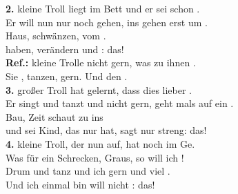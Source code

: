

\textbf{2.} kleine Troll liegt  im Bett und  er sei schon .\\
Er will nun nur noch  gehen, ins  gehen erst um .\\
Haus,  schwänzen,   vom .\\
 haben,  verändern und  :  das!\\[0.3em]
\textbf{Ref.:}  kleine Trolle  nicht gern, was  zu ihnen .\\
Sie , tanzen,  gern. Und  den  .\\[0.3em]
\textbf{3.}  großer Troll hat  gelernt, dass  dies lieber .\\
Er singt und tanzt und  nicht gern, geht mals auf ein .\\
Bau,  Zeit schaut  zu  ins  \\
und sei Kind, das  nur hat, sagt  nur  streng:  das!\\[0.3em]
\textbf{4.}  kleine Troll, der  nun auf, hat  noch im Ge.\\
Was für ein Schrecken,  Graus, so  will ich ! \\
Drum  und tanz und  ich gern und   viel . \\
Und  ich einmal  bin will  nicht :  das!
